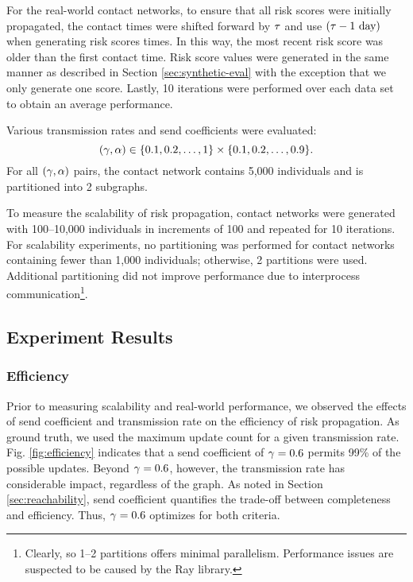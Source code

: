 For the real-world contact networks, to ensure that all risk scores were initially propagated, the contact times were shifted forward by $\tau$ and use $(\tau - 1 \text{ day})$ when generating risk scores times. In this way, the most recent risk score was older than the first contact time. Risk score values were generated in the same manner as described in Section \ref{sec:synthetic-eval} with the exception that we only generate one score. Lastly, 10 iterations were performed over each data set to obtain an average performance.

Various transmission rates and send coefficients were evaluated:
\begin{equation*}
  (\gamma, \alpha) \in \{0.1, 0.2, \ldots, 1\} \times \{0.1, 0.2, \ldots, 0.9\}.
\end{equation*}
For all $(\gamma, \alpha)$ pairs, the contact network contains 5,000 individuals and is partitioned into 2 subgraphs. 

To measure the scalability of risk propagation, contact networks were generated with 100--10,000 individuals in increments of 100 and repeated for 10 iterations. For scalability experiments, no partitioning was performed for contact networks containing fewer than 1,000 individuals; otherwise, 2 partitions were used. Additional partitioning did not improve performance due to interprocess communication\footnote{Clearly, so 1--2 partitions offers minimal parallelism. Performance issues are suspected to be caused by the Ray library.}.

\subsection{Experiment Results}

\subsubsection{Efficiency}

Prior to measuring scalability and real-world performance, we observed the effects of send coefficient and transmission rate on the efficiency of risk propagation. As ground truth, we used the maximum update count for a given transmission rate. Fig. \ref{fig:efficiency} indicates that a send coefficient of $\gamma = 0.6$ permits 99\% of the possible updates. Beyond $\gamma = 0.6$, however, the transmission rate has considerable impact, regardless of the graph. As noted in Section \ref{sec:reachability}, send coefficient quantifies the trade-off between completeness and efficiency. Thus, $\gamma = 0.6$ optimizes for both criteria.

